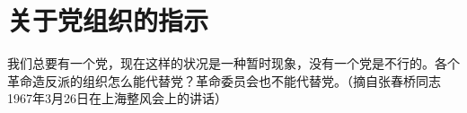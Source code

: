 \section[关于党组织的指示（一九六七年三月）]{关于党组织的指示}


我们总要有一个党，现在这样的状况是一种暂时现象，没有一个党是不行的。各个革命造反派的组织怎么能代替党？革命委员会也不能代替党。（摘自张春桥同志1967年3月26日在上海整风会上的讲话）

